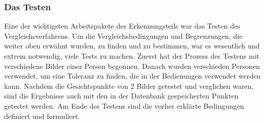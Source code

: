 \subsubsection{Das Testen}
Eine der wichtigsten Arbeitspakete des Erkennungsteils war das Testen des Vergleichsverfahrens. Um die Vergleichsbedingungen und Begrenzungen, die weiter oben erwähnt wurden, zu finden und zu bestimmen, war es wesentlich und extrem notwendig, viele Tests zu machen. Zuerst hat der Prozess des Testens mit verschiedene Bilder einer Person begonnen. Danach wurden verschieden Personen verwendet, um eine Toleranz zu finden, die in der Bedienungen verwendet werden kann. Nachdem die Gesichtspunkte von 2 Bilder getestet und verglichen waren, sind die Ergebnisse auch mit den in der Datenbank gespeicherten Punkten getestet werden. Am Ende des Testens sind die vorher erklärte Bedingungen definiert und formuliert.\\

